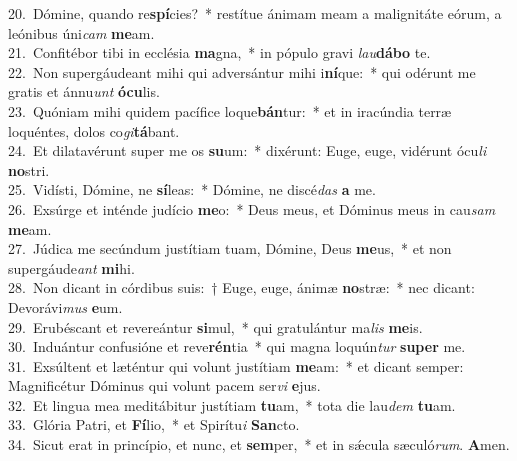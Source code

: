 {20.~}Dómine, quando re\textbf{spí}cies?~* restítue ánimam meam a malignitáte eórum, a leónibus úni\textit{cam} \textbf{me}am.\\
{21.~}Confitébor tibi in ecclésia \textbf{ma}gna,~* in pópulo gravi \textit{lau}\textbf{dá}\textbf{bo} te.\\
{22.~}Non supergáudeant mihi qui adversántur mihi i\textbf{ní}que:~* qui odérunt me gratis et ánnu\textit{unt} \textbf{ó}\textbf{cu}lis.\\
{23.~}Quóniam mihi quidem pacífice loque\textbf{bán}tur:~* et in iracúndia terræ loquéntes, dolos co\textit{gi}\textbf{tá}bant.\\
{24.~}Et dilatavérunt super me os \textbf{su}um:~* dixérunt: Euge, euge, vidérunt ócu\textit{li} \textbf{no}stri.\\
{25.~}Vidísti, Dómine, ne \textbf{sí}leas:~* Dómine, ne discé\textit{das} \textbf{a} me.\\
{26.~}Exsúrge et inténde judício \textbf{me}o:~* Deus meus, et Dóminus meus in cau\textit{sam} \textbf{me}am.\\
{27.~}Júdica me secúndum justítiam tuam, Dómine, Deus \textbf{me}us,~* et non supergáude\textit{ant} \textbf{mi}hi.\\
{28.~}Non dicant in córdibus suis:~† Euge, euge, ánimæ \textbf{no}stræ:~* nec dicant: Devorávi\textit{mus} \textbf{e}um.\\
{29.~}Erubéscant et revereántur \textbf{si}mul,~* qui gratulántur ma\textit{lis} \textbf{me}is.\\
{30.~}Induántur confusióne et reve\textbf{rén}tia~* qui magna loquún\textit{tur} \textbf{su}\textbf{per} me.\\
{31.~}Exsúltent et læténtur qui volunt justítiam \textbf{me}am:~* et dicant semper: Magnificétur Dóminus qui volunt pacem ser\textit{vi} \textbf{e}jus.\\
{32.~}Et lingua mea meditábitur justítiam \textbf{tu}am,~* tota die lau\textit{dem} \textbf{tu}am.\\
{33.~}Glória Patri, et \textbf{Fí}lio,~* et Spirítu\textit{i} \textbf{San}cto.\\
{34.~}Sicut erat in princípio, et nunc, et \textbf{sem}per,~* et in sǽcula sæculó\textit{rum}. \textbf{A}men.\\
